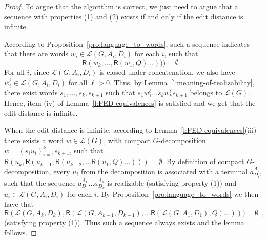 \documentclass{CSML}
\newcommand{\lang}{\mathcal{L}}
\newcommand{\R}{\textsf{R}}
\begin{document}
\begin{proof}
To argue that the algorithm is correct, we just need to argue that a sequence with properties (1) and (2) exists if and only if the edit distance is infinite.

\smallskip{}
According to Proposition~\ref{pro:language_to_words}, such a sequence indicates that there are words $w_i\in \lang(G,A_i,D_i)$ for each $i$, such that 
\[\R(w_k, \ldots, \R(w_1, Q) \ldots ))) = \emptyset\enspace .\]
For all $i$, since $\lang(G,A_i,D_i)$ is closed under concatenation, we also have $w_i^\ell\in \lang(G,A_i,D_i)$ for all $\ell>0$.
Thus, by Lemma~\ref{l:meaning-of-realizability}, there exist words $s_1, \ldots, s_k, s_{k+1}$ such that
$s_1 w_1^\ell \ldots s_k w_k^\ell s_{k+1}$ belongs to $\lang(G)$.
Hence, item (iv) of Lemma~\ref{l:FED-equivalences} is satisfied and we get that the edit distance is infinite. 

\smallskip{}
When the edit distance is infinite, according to Lemma~\ref{l:FED-equivalences}(iii) there exists a word $w \in \lang(G)$, with compact $G$-decomposition
$w=(s_i u_i)_{i=1}^{k}s_{k+1}$, such that
$\R(u_k, \R(u_{k-1}, \R(u_{k-2}, \ldots \R(u_1, Q) \ldots ))) = \emptyset$. 
By definition of compact $G$-decomposition, every $u_i$ from the decomposition is associated with a terminal $a_{D_i}^{A_i}$, such that the sequence $a_{D_1}^{A_1} \ldots a_{D_k}^{A_k}$ is realizable (satisfying property (1)) and $u_i\in \lang(G,A_i,D_i)$ for each $i$. By Proposition~\ref{pro:language_to_words} we then have that \[\R(\lang(G,A_k,D_k), \R(\lang(G,A_{k-1},D_{k-1}),  \ldots \R(\lang(G,A_1,D_1), Q) \ldots ))) = \emptyset\enspace ,\] (satisfying property (1)). Thus such a sequence always exists and the lemma follows.
\end{proof}
\end{document}
